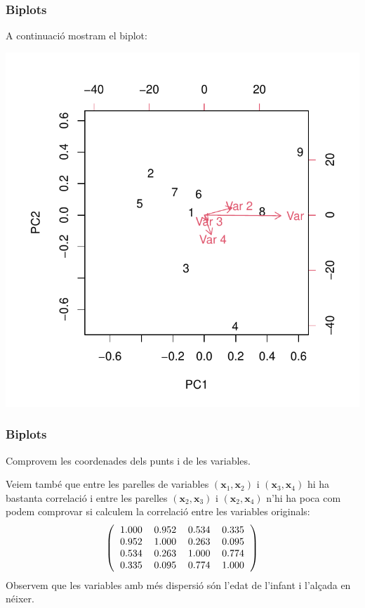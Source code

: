 \documentclass[12pt,t]{beamer}
\theoremstyle{plain}
\theoremstyle{definition}
\begin{document}
\begin{frame}
\frametitle{Biplots}
A continuació mostram el biplot:
\vspace*{0cm}

\includegraphics{ACP-072}
\end{frame}

\begin{frame}
\frametitle{Biplots}
Comprovem les coordenades dels punts i de les variables.
\medskip

Veiem també que entre les parelles de variables $(\mathbf{x}_1, \mathbf{x}_2)$ i   $(\mathbf{x}_3,\mathbf{x}_4)$ hi ha bastanta correlació i entre les parelles $(\mathbf{x}_2, \mathbf{x}_3)$ i $(\mathbf{x}_2, \mathbf{x}_4)$ n'hi ha poca com podem comprovar si calculem la correlació entre les variables originals:
\[
\left(
\begin{tabular}{rrrr}
  1.000 & 0.952 & 0.534 & 0.335 \\ 
  0.952 & 1.000 & 0.263 & 0.095 \\ 
  0.534 & 0.263 & 1.000 & 0.774 \\ 
  0.335 & 0.095 & 0.774 & 1.000 \\ 
  \end{tabular}\right)
\]
Observem que les variables amb més dispersió són l'edat de l'infant i l'alçada en néixer.
\end{frame}
\end{document}
